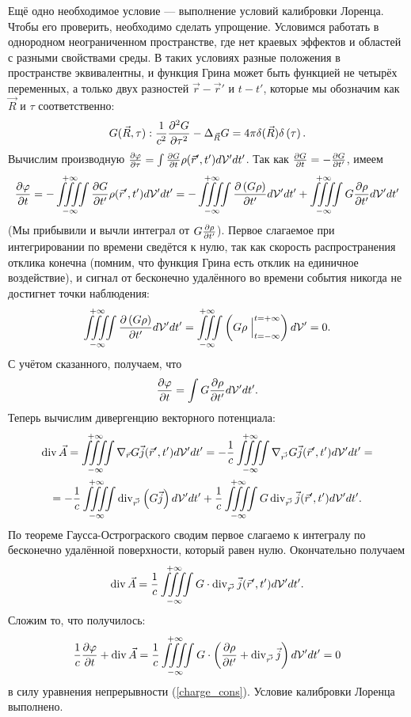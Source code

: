     Ещё одно необходимое условие --- выполнение условий калибровки Лоренца. Чтобы его проверить, необходимо сделать упрощение. Условимся работать
    в однородном неограниченном пространстве, где нет краевых эффектов и областей с разными свойствами среды. В таких условиях разные положения в
    пространстве эквивалентны, и функция Грина может быть функцией не четырёх переменных, а только двух разностей $\vec{r} - \vec{r}'$ и $t - t'$,
    которые мы обозначим как $\vec{R}$ и $\tau$ соответственно:
    \[
        G(\vec{R}, \tau) : \frac 1{c^2} \frac{\partial^2G}{\partial{\tau}^2} - \Delta_{\vec{R}}G = 4\pi\delta(\vec{R})\delta\left({\tau}\right).
    \]
    Вычислим производную $\frac{\partial\varphi}{\partial\tau} = \int \frac{\partial G}{\partial t}\rho(\vec{r}', t')d\mathcal{V}'dt'$. Так как $\frac{\partial G}{\partial t} = -\frac{\partial G}{\partial t'}$, имеем
    \[
        \frac{\partial\varphi}{\partial t} = -\iiiint\limits_{-\infty}^{+\infty} \frac{\partial G}{\partial t'}\rho(\vec{r}', t')d\mathcal{V}'dt' = 
        -\iiiint\limits_{-\infty}^{+\infty} \frac{\partial\left({G\rho}\right)}{\partial t'}d\mathcal{V}'dt' + \iiiint\limits_{-\infty}^{+\infty} G\frac{\partial\rho}{\partial t'}d\mathcal{V}'dt'
    \]
    (Мы прибывили и вычли интеграл от $G\frac{\partial\rho}{\partial t'}$). Первое слагаемое при интегрировании по времени сведётся к нулю, так как скорость
    распространения отклика конечна (помним, что функция Грина есть отклик на единичное воздействие), и сигнал от бесконечно удалённого во времени
    события никогда не достигнет точки наблюдения:
    \[
        \iiiint\limits_{-\infty}^{+\infty}\frac{\partial\left({G\rho}\right)}{\partial t'}d\mathcal{V}'dt' = 
        \iiint\limits_{-\infty}^{+\infty} \left({G\rho\Bigm|_{t=-\infty}^{t=+\infty}}\right)d\mathcal{V}' = 0.
    \]
    С учётом сказанного, получаем, что
    \[
        \frac{\partial\varphi}{\partial t} = \int G\frac{\partial\rho}{\partial t'}d\mathcal{V}'dt'.
    \]
    Теперь вычислим дивергенцию векторного потенциала:
    \begin{gather*}
        \operatorname{div}\vec{A} = \iiiint\limits_{-\infty}^{+\infty} \nabla_{\vec{r}} G \vec{j}(\vec{r}', t')d\mathcal{V}'dt' =
        -\frac 1c \iiiint\limits_{-\infty}^{+\infty} \nabla_{\vec{r'}} G\vec{j}(\vec{r}', t')d\mathcal{V}'dt' = \\ =
        -\frac 1c \iiiint\limits_{-\infty}^{+\infty} \operatorname{div}_{\vec{r'}}\left({G\vec{j}}\right)d\mathcal{V}'dt' + \frac{1}{c}\iiiint\limits_{-\infty}^{+\infty} G\operatorname{div}_{\vec{r'}}\vec{j}(\vec{r}', t')d\mathcal{V}'dt'.
    \end{gather*}
    По теореме Гаусса-Острограского сводим первое слагаемо к интегралу по бесконечно удалённой поверхности, который равен нулю. 
    Окончательно получаем
    \[
        \operatorname{div}\vec{A} = \frac{1}{c}\iiiint\limits_{-\infty}^{+\infty} G\cdot\operatorname{div}_{\vec{r'}}\vec{j}(\vec{r}', t')d\mathcal{V}'dt'.
    \]
    Сложим то, что получилось:
    \[
        \frac 1c \frac{\partial\varphi}{\partial t} + \operatorname{div}\vec{A} =
        \frac{1}{c}\iiiint\limits_{-\infty}^{+\infty} G\cdot\left({\frac{\partial\rho}{\partial t'} + \operatorname{div}_{\vec{r'}}\vec{j}}\right)d\mathcal{V}'dt' = 0
    \]
    в силу уравнения непрерывности (\ref{charge_cons}). Условие калибровки Лоренца выполнено.

